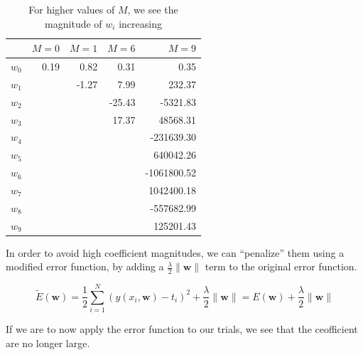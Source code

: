 \documentclass{tufte-handout}
\begin{document}
\begin{table}[h]
  \footnotesize%
  \begin{center}
    \begin{tabular}{lrrrr}
      \toprule
       & $M = 0$ & $M = 1$ & $M = 6$ & $M = 9$ \\
      \midrule
      $w_0$ & 0.19 &  0.82 &   0.31 &        0.35 \\
      $w_1$ &      & -1.27 &   7.99 &      232.37 \\
      $w_2$ &      &       & -25.43 &    -5321.83 \\
      $w_3$ &      &       &  17.37 &    48568.31 \\
      $w_4$ &      &       &        &  -231639.30 \\
      $w_5$ &      &       &        &   640042.26 \\
      $w_6$ &      &       &        & -1061800.52 \\
      $w_7$ &      &       &        &  1042400.18 \\
      $w_8$ &      &       &        &  -557682.99 \\
      $w_9$ &      &       &        &   125201.43 \\
      \bottomrule
    \end{tabular}
  \end{center}
  \caption{For higher values of $M$, we see the magnitude of $w_i$ increasing}
  \label{tab:font-sizes}
\end{table}

In order to avoid high coefficient magnitudes, we can ``penalize'' them using
a modified error function, by adding a $\frac{\lambda}{2}\|\mathbf{w}\|$ term
to the original error function.

\begin{equation}
  \widetilde{E}(\mathbf{w}) =
    \frac{1}{2}\sum\limits_{i = 1}^N(y(x_i, \mathbf{w}) - t_i)^2
      + \frac{\lambda}{2}\|\mathbf{w}\|
    = E(\mathbf{w}) + \frac{\lambda}{2}\|\mathbf{w}\|
\end{equation}

If we are to now apply the error function to our trials, we see that the
ceofficient are no longer large.
\end{document}
